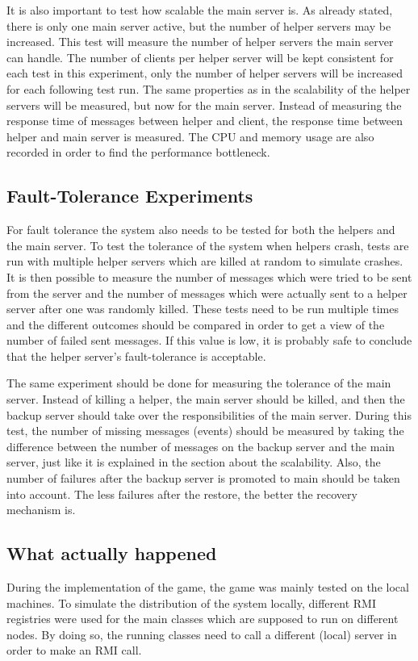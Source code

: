 It is also important to test how scalable the main server is. 
As already stated, there is only one main server active, but the number of helper servers may be increased.
This test will measure  the number of helper servers the main server can handle.
The number of clients per helper server will be kept consistent for each test in this experiment, only the number of helper servers will be increased for each following test run.
The same properties as in the scalability of the helper servers will be measured, but now for the main server.
Instead of measuring the response time of messages between helper and client, the response time between helper and main server is measured.
The CPU and memory usage are also recorded in order to find the performance bottleneck.


\subsection{Fault-Tolerance Experiments}
For fault tolerance the system also needs to be tested for both the helpers and the main server.
To test the tolerance of the system when helpers crash, tests are run with multiple helper servers which are killed at random to simulate crashes.
It is then possible to measure the number of messages which were tried to be sent from the server and the number of messages which were actually sent to a helper server after one was randomly killed.
These tests need to be run multiple times and the different outcomes should be compared in order to get a view of the number of failed sent messages.
If this value is low, it is probably safe to conclude that the helper server's fault-tolerance is acceptable.

The same experiment should be done for measuring the tolerance of the main server.
Instead of killing a helper, the main server should be killed, and then the backup server should take over the responsibilities of the main server.
During this test, the number of missing messages (events) should be measured by taking the difference between the number of messages on the backup server and the main server, just like it is explained in the section about the scalability.
Also, the number of failures after the backup server is promoted to main should be taken into account.
The less failures after the restore, the better the recovery mechanism is.

\subsection{What actually happened}
During the implementation of the game, the game was mainly tested on the local machines.
To simulate the distribution of the system locally, different RMI registries were used for the main classes which are supposed to run on different nodes.
By doing so, the running classes need to call a different (local) server in order to make an RMI call.

